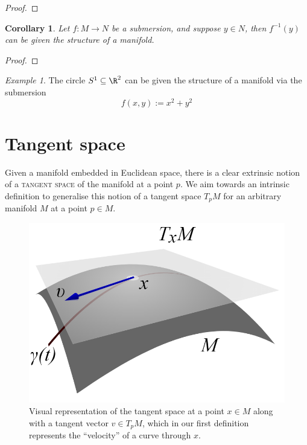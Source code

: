 \documentclass[reqno]{amsart}
\newtheorem{corollary}[theorem]{Corollary}
\theoremstyle{definition}
\theoremstyle{remark}
\newtheorem*{example}{Example}
\renewcommand{\emph}{\textsc}
\begin{document}
\begin{proof}
	
\end{proof}

\begin{corollary}
	Let $f: M \to N$ be a submersion, and suppose $y \in N$, then $f^{-1} (y)$ can be given the structure of a manifold. 
\end{corollary}

\begin{proof}
	
\end{proof}

\begin{example}
	The circle $S^1 \subseteq \R^2$ can be given the structure of a manifold via the submersion 
		\[ f(x, y) := x^2 + y^2 \]
\end{example}

\section{Tangent space}

Given a manifold embedded in Euclidean space, there is a clear extrinsic notion of a \emph{tangent space} of the manifold at a point $p$. We aim towards an intrinsic definition to generalise this notion of a tangent space $T_p M$ for an arbitrary manifold $M$ at a point $p \in M$. 

\begin{figure}[h]
	\begin{center}
		\includegraphics[scale =0.5]{tangent}
		\caption{Visual representation of the tangent space at a point $x \in M$ along with a tangent vector $v \in T_p M$, which in our first definition represents the ``velocity'' of a curve through $x$. }
	\end{center}	
\end{figure}
\end{document}
